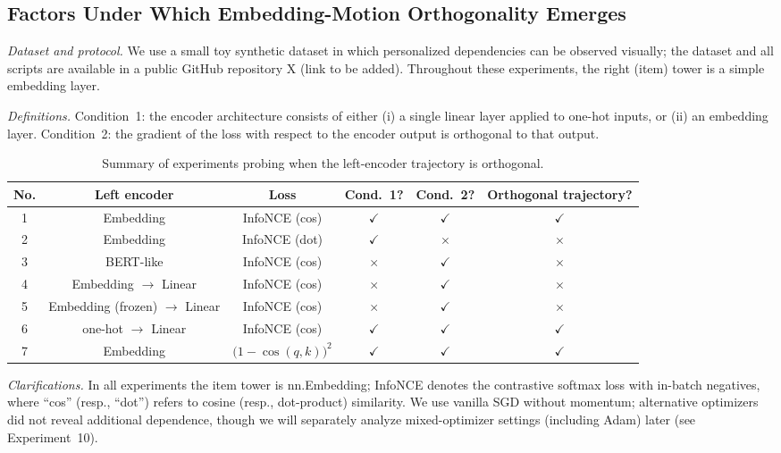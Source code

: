 \subsection{Factors Under Which Embedding-Motion Orthogonality Emerges}

\textit{Dataset and protocol.} We use a small toy synthetic dataset in which personalized dependencies can be observed visually; the dataset and all scripts are available in a public GitHub repository X (link to be added). Throughout these experiments, the right (item) tower is a simple embedding layer.

\textit{Definitions.} 
Condition~1: the encoder architecture consists of either (i) a single linear layer applied to one-hot inputs, or (ii) an embedding layer. 
Condition~2: the gradient of the loss with respect to the encoder output is orthogonal to that output.

\begin{table*}[!t]
\centering
\small
\begin{tabular}{@{}cccccc@{}}
\toprule
No. & Left encoder & Loss & Cond.~1? & Cond.~2? & Orthogonal trajectory? \\
\midrule
1 & Embedding & InfoNCE (cos) & $\checkmark$ & $\checkmark$ & $\checkmark$ \\
2 & Embedding & InfoNCE (dot) & $\checkmark$ & $\times$ & $\times$ \\
3 & BERT-like & InfoNCE (cos) & $\times$ & $\checkmark$ & $\times$ \\
4 & Embedding $\to$ Linear & InfoNCE (cos) & $\times$ & $\checkmark$ & $\times$ \\
5 & Embedding (frozen) $\to$ Linear & InfoNCE (cos) & $\times$ & $\checkmark$ & $\times$ \\
6 & one-hot $\to$ Linear & InfoNCE (cos) & $\checkmark$ & $\checkmark$ & $\checkmark$ \\
7 & Embedding & $\bigl(1 - \cos(q,k)\bigr)^{2}$ & $\checkmark$ & $\checkmark$ & $\checkmark$ \\
\bottomrule
\end{tabular}
\caption{Summary of experiments probing when the left-encoder trajectory is orthogonal.}
\end{table*}

\textit{Clarifications.} In all experiments the item tower is nn.Embedding; InfoNCE denotes the contrastive softmax loss with in-batch negatives, where ``cos'' (resp., ``dot'') refers to cosine (resp., dot-product) similarity. We use vanilla SGD without momentum; alternative optimizers did not reveal additional dependence, though we will separately analyze mixed-optimizer settings (including Adam) later (see Experiment~10).

